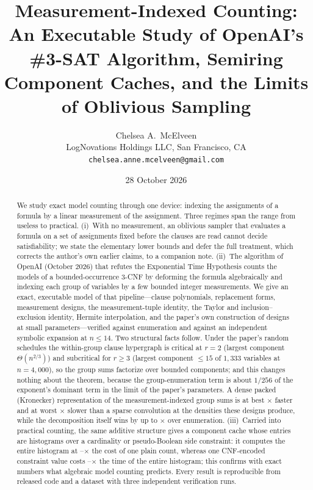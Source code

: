 \documentclass[11pt]{article}
\title{\textbf{Measurement-Indexed Counting:}\\[2pt] \large An Executable Study of OpenAI's \#3-SAT Algorithm, Semiring Component Caches, and the Limits of Oblivious Sampling}
\author{Chelsea A.\ McElveen\\ \small LogNovations Holdings LLC, San Francisco, CA\\ \small \texttt{chelsea.anne.mcelveen@gmail.com}}
\date{28 October 2026}
\theoremstyle{definition}
\theoremstyle{remark}
\begin{document}
\maketitle

\begin{abstract}
We study exact model counting through one device: indexing the assignments of a formula by a linear measurement of the assignment. Three regimes span the range from useless to practical. (i)~With no measurement, an oblivious sampler that evaluates a formula on a set of assignments fixed before the clauses are read cannot decide satisfiability; we state the elementary lower bounds and defer the full treatment, which corrects the author's own earlier claims, to a companion note. (ii)~The algorithm of OpenAI (October 2026) that refutes the Exponential Time Hypothesis counts the models of a bounded-occurrence 3-CNF by deforming the formula algebraically and indexing each group of variables by a few bounded integer measurements. We give an exact, executable model of that pipeline---clause polynomials, replacement forms, measurement designs, the measurement-tuple identity, the Taylor and inclusion--exclusion identity, Hermite interpolation, and the paper's own construction of designs at small parameters---verified against enumeration and against an independent symbolic expansion at $n \le 14$. Two structural facts follow. Under the paper's random schedules the within-group clause hypergraph is critical at $r = 2$ (largest component $\Theta(n^{2/3})$) and subcritical for $r \ge 3$ (largest component $\le 15$ of $1{,}333$ variables at $n = 4{,}000$), so the group sums factorize over bounded components; and this changes nothing about the theorem, because the group-enumeration term is about $1/256$ of the exponent's dominant term in the limit of the paper's parameters. A dense packed (Kronecker) representation of the measurement-indexed group sums is at best \fibreDictRatioMax$\times$ faster and at worst \fibrePackedOverDictMax$\times$ slower than a sparse convolution at the densities these designs produce, while the decomposition itself wins by up to \fibreBestSubcritMax$\times$ over enumeration. (iii)~Carried into practical counting, the same additive structure gives a component cache whose entries are histograms over a cardinality or pseudo-Boolean side constraint: it computes the entire histogram at \histOverPlainMin--\histOverPlainMax$\times$ the cost of one plain count, whereas one CNF-encoded constraint value costs \encRatioMin--\encRatioMax$\times$ the time of the entire histogram; this confirms with exact numbers what algebraic model counting predicts. Every result is reproducible from released code and a dataset with three independent verification runs.
\end{abstract}
\end{document}
